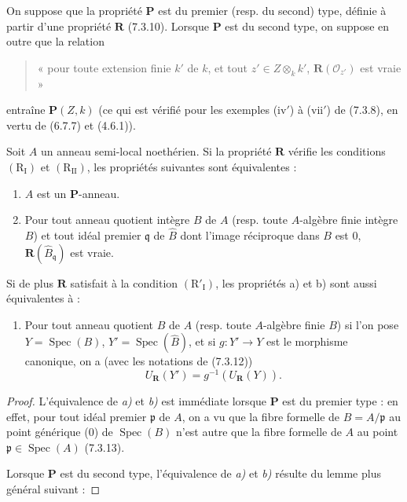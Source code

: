 \begin{proposition}[7.3.16]
\label{IV.2.s7.3.16-fr}
On suppose que la propriété $\boldsymbol P$ est du premier \textup{(resp.} du
second) type, définie à partir d'une propriété $\boldsymbol R$ \textup{(7.3.10)}.
Lorsque $\boldsymbol P$ est du second type, on suppose en outre que la
relation
\begin{quote}
« pour toute extension \textup{finie} $k'$ de $k$, et tout
$z'\in Z\otimes_k k'$, $\boldsymbol R(\mathscr O_{z'})$ est vraie »
\end{quote}
entraîne $\boldsymbol P(Z,k)$ \textup{(ce qui est vérifié pour les exemples
(iv$'$) à (vii$'$) de (7.3.8), en vertu de (6.7.7) et (4.6.1))}.

Soit $A$ un anneau semi-local noethérien. Si la propriété
$\boldsymbol R$ vérifie les conditions $(\mathrm R_{\mathrm I})$ et
$(\mathrm R_{\mathrm{II}})$, les propriétés suivantes sont équivalentes :
\begin{enumerate}
\item[\emph{a)}] $A$ est un $\boldsymbol P$-anneau.
\item[\emph{b)}] Pour tout anneau quotient intègre $B$ de $A$ \textup{(resp.} toute
$A$-algèbre finie intègre $B$) et tout idéal premier $\mathfrak q$ de
$\widehat B$ dont l'image réciproque dans $B$ est 0,
$\boldsymbol R(\widehat B_{\mathfrak q})$ est vraie.
\end{enumerate}

Si de plus $\boldsymbol R$ satisfait à la condition
$(\mathrm R'_{\mathrm I})$, les propriétés \textup{a)} et \textup{b)} sont aussi
équivalentes à :
\begin{enumerate}
\item[\emph{c)}] Pour tout anneau quotient $B$ de $A$ \textup{(resp.} toute $A$-algèbre finie
$B$) si l'on pose $Y=\operatorname{Spec}(B)$,
$Y'=\operatorname{Spec}(\widehat B)$, et si $g:Y'\to Y$ est le morphisme
canonique, on a (avec les notations de \textup{(7.3.12)})
\begin{equation}
U_{\mathbf{R}}(Y')=g^{-1}(U_{\mathbf{R}}(Y)).
\tag{7.3.16.1}
\label{IV.2.eq.7.3.16.1-fr}
\end{equation}
\end{enumerate}
\end{proposition}

\begin{proof}
L'équivalence de \emph{a)} et \emph{b)} est immédiate lorsque $\boldsymbol P$ est du
premier type : en effet, pour tout idéal premier $\mathfrak p$ de $A$, on
a vu que la fibre formelle de $B=A/\mathfrak p$ au point générique (0) de
$\operatorname{Spec}(B)$ n'est autre que la fibre formelle de $A$ au
point $\mathfrak p\in\operatorname{Spec}(A)$ (7.3.13).

Lorsque $\boldsymbol P$ est du second type, l'équivalence de \emph{a)} et \emph{b)}
résulte du lemme plus général suivant :
\end{proof}

